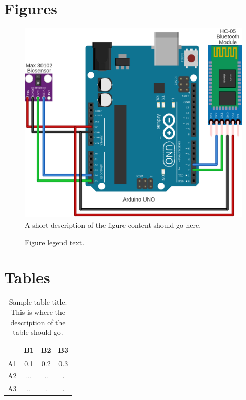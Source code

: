 \documentclass{bmcart}
\begin{document}
\begin{backmatter}

\section*{Figures}
  \begin{figure}[h!]
  \includegraphics[width=.75\linewidth]{png_images/circuit_desing.png}
  \caption{
      A short description of the figure content should go here.}
      \end{figure}

\begin{figure}[h!]
  \caption{
      Figure legend text.}
      \end{figure}


\section*{Tables}
\begin{table}[h!]
\caption{Sample table title. This is where the description of the table should go.}
      \begin{tabular}{cccc}
        \hline
           & B1  &B2   & B3\\ \hline
        A1 & 0.1 & 0.2 & 0.3\\
        A2 & ... & ..  & .\\
        A3 & ..  & .   & .\\ \hline
      \end{tabular}
\end{table}


\end{backmatter}
\end{document}
